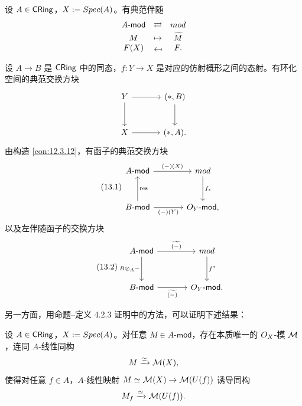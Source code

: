 \begin{corollary}\label{cor:13.1.2}
设 $A\in\mathsf{CRing}$，$X:=Spec(A)$。有典范伴随
\[
\begin{array}{ccc}
A\text{-}\mathsf{mod} & \rightleftarrows & \omod\\[0.5ex]
M & \mapsto & \widetilde{M}\\
F(X) & \mapsfrom & F.
\end{array}
\]
\end{corollary}

\begin{construction}\label{con:13.1.3}
设 $A\to B$ 是 $\mathsf{CRing}$ 中的同态，$f\colon Y\to X$ 是对应的仿射概形之间的态射。有环化空间的典范交换方块
\[
\begin{tikzcd}[row sep=2.6em,column sep=3.4em]
Y \arrow[r] \arrow[d] & (*,B) \arrow[d]\\
X \arrow[r] & (*,A).
\end{tikzcd}
\]
由构造 \ref{con:12.3.12}，有函子的典范交换方块
\begin{equation}\tag{13.1}\label{eq:13.1}
\begin{tikzcd}[row sep=3em,column sep=3.6em]
A\text{-}\mathsf{mod} \arrow[r,"(-)(X)"] & \omod \arrow[d,"f_*"]\\
B\text{-}\mathsf{mod} \arrow[r,"(-)(Y)"'] \arrow[u,"\mathrm{res}"'] & \cO_Y\text{-}\mathsf{mod},
\end{tikzcd}
\end{equation}
以及左伴随函子的交换方块
\begin{equation}\tag{13.2}\label{eq:13.2}
\begin{tikzcd}[row sep=3em,column sep=3.6em]
A\text{-}\mathsf{mod} \arrow[r,"\widetilde{(-)}"] \arrow[d,"B\otimes_A-"'] & \omod \arrow[d,"f^*"]\\
B\text{-}\mathsf{mod} \arrow[r,"\widetilde{(-)}"'] & \cO_Y\text{-}\mathsf{mod}.
\end{tikzcd}
\end{equation}
\end{construction}

另一方面，用命题–定义 4.2.3 证明中的方法，可以证明下述结果：

\begin{proposition}\label{prop:13.1.4}
设 $A\in\mathsf{CRing}$，$X:=Spec(A)$。对任意 $M\in A\text{-}\mathsf{mod}$，存在本质唯一的 $O_X$-模 $\mathcal{M}$，连同 $A$-线性同构
\[
M\xrightarrow{\simeq}\mathcal{M}(X),
\]
使得对任意 $f\in A$，$A$-线性映射 $M\simeq\mathcal{M}(X)\to\mathcal{M}(U(f))$ 诱导同构
\[
M_f\xrightarrow{\simeq}\mathcal{M}(U(f)).
\]
\end{proposition}

